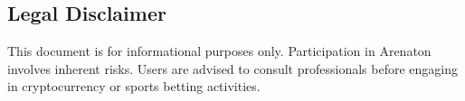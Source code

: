\documentclass[9pt]{article}
\begin{document}
\begin{multicols}{2}
		\section{Legal Disclaimer}
		This document is for informational purposes only. Participation in Arenaton involves inherent risks. Users are advised to consult professionals before engaging in cryptocurrency or sports betting activities.
		
	\end{multicols}
\end{document}
